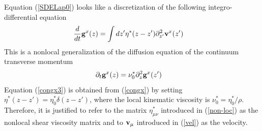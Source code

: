 \documentclass[b5paper,openright,10pt]{book}
\begin{document}
Equation (\ref{SDELap0}) looks    like    a   discretization    of    the    following
integro-differential  equation
\begin{align}
  \frac{d}{dt} {\bf g}^{x}(z)&=\int dz'{\eta}^*(z-z')\partial^2_{z'} {\bf v}^{x}(z')
\label{congx}
\end{align}
This is  a nonlocal generalization  of the diffusion equation  of the
continuum transverse  momentum
\begin{align}
  \partial_t {\bf g}^{x}(z)&=\nu^*_0\partial^2_{z}{\bf g}^{x}(z')
\label{congx3}
\end{align}
Equation   (\ref{congx3})   is  obtained  from  (\ref{congx})   by  setting
$\eta^*(z-z')=\eta^*_0\delta(z-z')$,   where   the   local   kinematic
viscosity is  $\nu^*_0=\eta^*_0/\rho$.  Therefore, it is  justified to
refer to the matrix $\eta^*_{\mu\nu}$ introduced in (\ref{non-loc}) as
the  nonlocal shear  viscosity matrix  and to  ${\bf v}_\mu$ introduced  in
(\ref{vel}) as the velocity.

\end{document}
